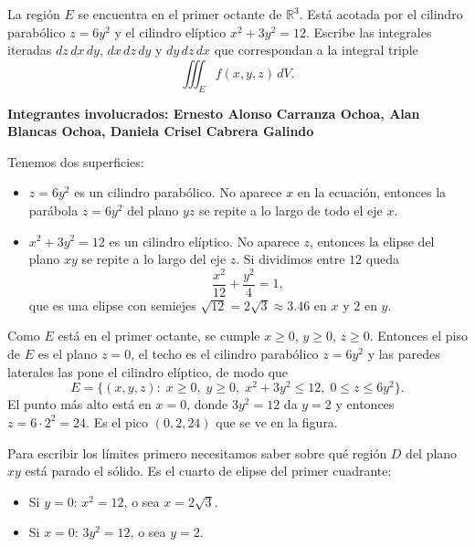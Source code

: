 \begin{ejercicio}
    La región $E$ se encuentra en el primer octante de $\mathbb{R}^3$. Está acotada por
    el cilindro parabólico $z = 6y^2$ y el cilindro elíptico $x^2 + 3y^2 = 12$.
    Escribe las integrales iteradas $dz\,dx\,dy$, $dx\,dz\,dy$ y $dy\,dz\,dx$ que
    correspondan a la integral triple
    \[
        \iiint_E f(x, y, z)\, dV.
    \]
\end{ejercicio}

\begin{respuesta}
    \textbf{Integrantes involucrados: Ernesto Alonso Carranza Ochoa, Alan Blancas Ochoa, Daniela Crisel Cabrera Galindo }

    \bigskip
    Tenemos dos superficies:
    \begin{itemize}
        \item $z = 6y^2$ es un cilindro parabólico. No aparece $x$ en la ecuación,
              entonces la parábola $z=6y^2$ del plano $yz$ se repite a lo largo de todo
              el eje $x$.
        \item $x^2 + 3y^2 = 12$ es un cilindro elíptico. No aparece $z$, entonces la
              elipse del plano $xy$ se repite a lo largo del eje $z$. Si dividimos
              entre $12$ queda
              \[
                  \frac{x^2}{12} + \frac{y^2}{4} = 1 ,
              \]
              que es una elipse con semiejes $\sqrt{12} = 2\sqrt{3}\approx 3.46$ en $x$
              y $2$ en $y$.
    \end{itemize}
    Como $E$ está en el primer octante, se cumple $x\geq 0$, $y\geq 0$, $z\geq 0$.
    Entonces el piso de $E$ es el plano $z=0$, el techo es el cilindro parabólico
    $z = 6y^2$  y las paredes laterales las pone el cilindro elíptico, de modo que
    \[
        E = \{(x,y,z) : \; x\geq 0,\; y\geq 0,\; x^2+3y^2\leq 12,\; 0\leq z\leq 6y^2\}.
    \]
    El punto más alto está en $x=0$, donde $3y^2=12$ da $y=2$ y entonces
    $z = 6\cdot 2^2 = 24$. Es el pico $(0,2,24)$ que se ve en la figura.

    \bigskip
     Para escribir los límites
    primero necesitamos saber sobre qué región $D$ del plano $xy$ está parado el sólido.
    Es el cuarto de elipse del primer cuadrante:
    \begin{itemize}
        \item Si $y=0$: $x^2 = 12$, o sea $x=2\sqrt{3}$.
        \item Si $x=0$: $3y^2 = 12$, o sea $y=2$.
    \end{itemize}


\end{respuesta}
